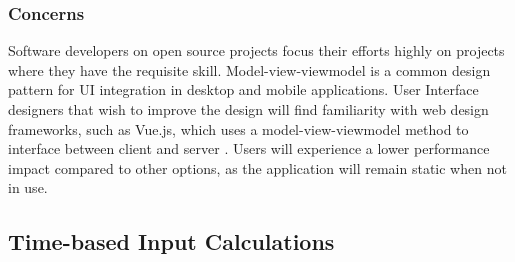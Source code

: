 \documentclass[onecolumn, draftclsnofoot,10pt, compsoc]{IEEEtran}
\begin{document}
\subsubsection{Concerns}
Software developers on open source projects focus their efforts highly on projects where they have the requisite skill.
Model-view-viewmodel is a common design pattern for UI integration in desktop and mobile applications. 
User Interface designers that wish to improve the design will find familiarity with web design frameworks, such as Vue.js, which uses a model-view-viewmodel method to interface between client and server \autocite{mvvm}.
Users will experience a lower performance impact compared to other options, as the application will remain static when not in use.

\subsection{Time-based Input Calculations}
\end{document}
